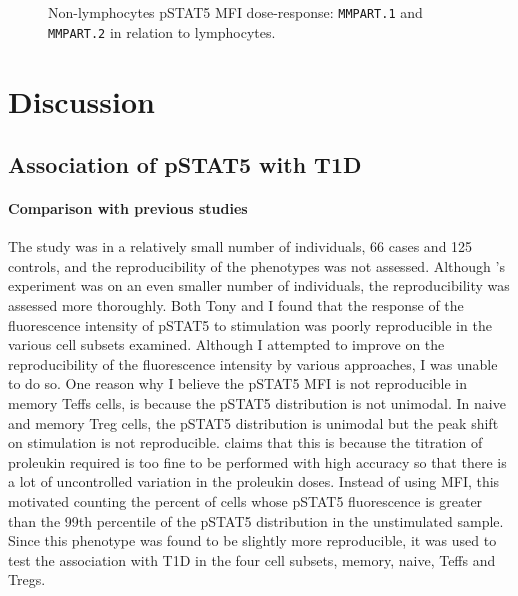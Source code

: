 \begin{figure}
\begin{minipage}{.5\textwidth}
\end{minipage}
\begin{minipage}{.3\textwidth}
{ Non-lymphocytes pSTAT5 MFI dose-response: \texttt{MMPART.1} and \texttt{MMPART.2} in relation to lymphocytes. }
{ }
\end{minipage}
\end{figure}

\clearpage


\section{Discussion}

\subsection{Association of pSTAT5 with T1D}

\paragraph{Comparison with previous studies}

The \citet{Long:2010ej} study was in a relatively small number of individuals, 66 cases and 125 controls, and the reproducibility of the phenotypes was not assessed.
Although 's experiment was on an even smaller number of individuals, the reproducibility was assessed more thoroughly.
Both Tony and I found that the response of the fluorescence intensity of pSTAT5 to stimulation was poorly reproducible in the various cell subsets examined.
Although I attempted to improve on the reproducibility of the fluorescence intensity by various approaches,
I was unable to do so.
One reason why I believe the pSTAT5 MFI is not reproducible in memory Teffs cells, is because the pSTAT5 distribution is not unimodal.
In naive and memory Treg cells, the pSTAT5 distribution is unimodal but the peak shift on stimulation is not reproducible.
 claims that this is because the titration of proleukin required is too fine to be performed with high accuracy so that there is a lot of uncontrolled variation in the proleukin doses.
Instead of using MFI, this motivated counting the percent of cells whose pSTAT5 fluorescence is greater than the 99th percentile of the pSTAT5 distribution in the unstimulated sample.
Since this phenotype was found to be slightly more reproducible, it was used to test the association with T1D in the four cell subsets, memory, naive, Teffs and Tregs.

